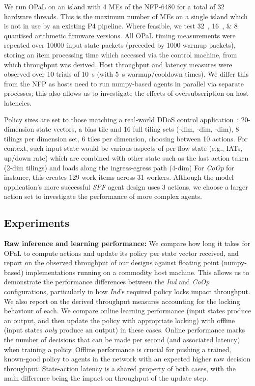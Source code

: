 \documentclass[
sigconf,natbib=false
]{acmart}
\newcommand{\fakepara}[1]{\noindent\textbf{#1:}}
\newcommand{\approachshort}{OPaL}
\newcommand{\Coopfw}{\emph{CoOp}}
\newcommand{\coopfw}{\Coopfw}
\newcommand{\Indfw}{\emph{Ind}}
\newcommand{\indfw}{\Indfw}
\begin{document}
We run \approachshort{} on an island with \num{4} MEs of the NFP-6480 for a total of \num{32} hardware threads.
This is the maximum number of MEs on a single island which is not in use by an existing P4 pipeline.
Where feasible, we test \SIlist{32;16;8}{\bit} quantised arithmetic firmware versions.
All \approachshort{} timing measurements were repeated over \num{10000} input state packets (preceded by \num{1000} warmup packets), storing an item processing time which accessed via the control machine, from which throughput was derived.
Host throughput and latency measures were observed over \num{10} trials of \SI{10}{\second} (with \SI{5}{\second} warmup/cooldown times).
We differ this from the NFP as hosts need to run numpy-based agents in parallel via separate processes; this also allows us to investigate the effects of oversubscription on host latencies.

Policy sizes are set to those matching a real-world DDoS control application~\parencite{DBLP:journals/tnsm/SimpsonRP20}: 20-dimension state vectors, a bias tile and 16 full tiling sets (-dim, -dim, -dim), 8 tilings per dimension set, 6 tiles per dimension, choosing between 10 actions.
For context, such input state would be various aspects of per-flow state (e.g., IATs, up/down rate) which are combined with other state such as the last action taken (2-dim tilings) and loads along the ingress-egress path (4-dim)
For \Coopfw{} for instance, this creates \num{129} work items across \num{31} workers.
Although the model application's more successful \emph{SPF} agent design uses 3 actions, we choose a larger action set to investigate the performance of more complex agents.

\subsection{Experiments}

\fakepara{Raw inference and learning performance}
We compare how long it takes for \approachshort{} to compute actions and update its policy per state vector received, and report on the observed throughput of our designs against floating point (numpy-based) implementations running on a commodity host machine.
This allows us to demonstrate the performance differences between the \indfw{} and \coopfw{} configurations, particularly in how \indfw's required policy locks impact throughput.
We also report on the derived throughput measures accounting for the locking behaviour of each.
We compare online learning performance (input states produce an output, and then update the policy with appropriate locking) with offline (input states \emph{only} produce an output) in these cases.
Online performance marks the number of decisions that can be made per second (and associated latency) when training a policy.
Offline performance is crucial for pushing a trained, known-good policy to agents in the network with an expected higher raw decision throughput.
State-action latency is a shared property of both cases, with the main difference being the impact on throughput of the update step.
\end{document}
